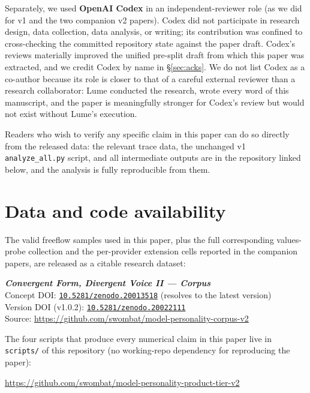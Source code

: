\documentclass[11pt,a4paper]{article}
\begin{document}
Separately, we used \textbf{OpenAI Codex} in an independent-reviewer role (as we did for v1 and the two companion v2 papers). Codex did not participate in research design, data collection, data analysis, or writing; its contribution was confined to cross-checking the committed repository state against the paper draft. Codex's reviews materially improved the unified pre-split draft from which this paper was extracted, and we credit Codex by name in \S\ref{sec:acks}. We do not list Codex as a co-author because its role is closer to that of a careful external reviewer than a research collaborator: Lume conducted the research, wrote every word of this manuscript, and the paper is meaningfully stronger for Codex's review but would not exist without Lume's execution.

Readers who wish to verify any specific claim in this paper can do so directly from the released data: the relevant trace data, the unchanged v1 \texttt{analyze\_all.py} script, and all intermediate outputs are in the repository linked below, and the analysis is fully reproducible from them.

\section*{Data and code availability}
\label{sec:data-availability}

The valid freeflow samples used in this paper, plus the full corresponding values-probe collection and the per-provider extension cells reported in the companion papers, are released as a citable research dataset:

\begin{center}
\textbf{\emph{Convergent Form, Divergent Voice II --- Corpus}} \\
\citep{tenner2026corpus} \quad
Concept DOI: \href{https://doi.org/10.5281/zenodo.20013518}{\texttt{10.5281/\allowbreak zenodo.20013518}} (resolves to the latest version) \\
Version DOI (v1.0.2): \href{https://doi.org/10.5281/zenodo.20022111}{\texttt{10.5281/\allowbreak zenodo.20022111}} \\
Source: \url{https://github.com/swombat/model-personality-corpus-v2}
\end{center}

The four scripts that produce every numerical claim in this paper live in \texttt{scripts/} of this repository (no working-repo dependency for reproducing the paper):
\begin{center}
\url{https://github.com/swombat/model-personality-product-tier-v2}
\end{center}
\end{document}
